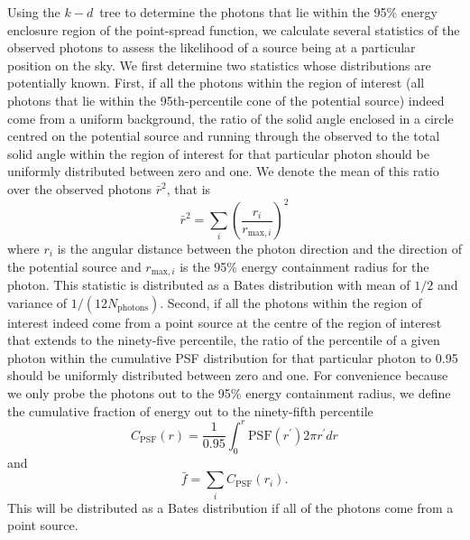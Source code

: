 \documentclass[useAMS,usenatbib]{mn2e}
\begin{document}
Using the $k-d$~tree to determine the photons that lie within the 95\%
energy enclosure region of the point-spread function, we calculate several
statistics of the observed photons to assess the likelihood of a
source being at a particular position on the sky.  We first determine
two statistics whose distributions are potentially known. First, if
all the photons within the region of interest (all photons that lie
within the 95th-percentile cone of the potential source) indeed come
from a uniform background, the ratio of the solid angle enclosed in a
circle centred on the potential source and running through the
observed to the total solid angle within the region of interest for
that particular photon should be uniformly distributed between zero
and one.  We denote the mean of this ratio over the observed photons
$\bar r^2$, that is
\begin{equation}
  \bar r^2 = \sum_i \left ( \frac{r_i}{r_{\mathrm{max},i}} \right )^2 
\end{equation}
where $r_i$ is the angular distance between the photon direction and
the direction of the potential source and $r_{\mathrm{max},i}$ is the
95\% energy containment radius for the photon.  This statistic is
distributed as a Bates distribution with mean of $1/2$ and variance of
$1/(12 N_\mathrm{photons})$.  Second, if all the photons within the
region of interest indeed come from a point source at the centre of
the region of interest that extends to the ninety-five percentile, the
ratio of the percentile of a given photon within the cumulative PSF
distribution for that particular photon to 0.95 should be uniformly
distributed between zero and one.  For convenience because we only
probe the photons out to the 95\% energy containment radius, we define
the cumulative fraction of energy out to the ninety-fifth percentile
\begin{equation}
  C_\mathrm{PSF} (r) = \frac{1}{0.95} \int_0^r \mathrm{PSF}(r^\prime) 2 \pi r^\prime d r
  \label{eq:1}
\end{equation}
and 
\begin{equation}
  \bar f = \sum_i C_\mathrm{PSF} (r_i).
  \label{eq:2}
\end{equation}
This will be distributed as a Bates distribution if all of the photons
come from a point source.
\end{document}
